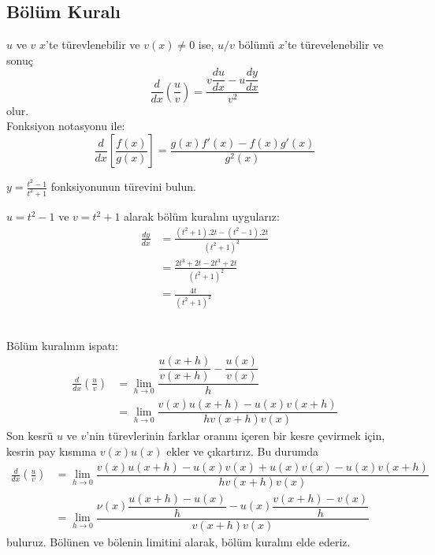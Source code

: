 \subsection{\protect Bölüm Kuralı}
$u$ ve $v$ $x$'te türevlenebilir ve $v(x)\ne 0$ ise, $u/v$ bölümü $x$'te türevelenebilir ve sonuç
	\begin{equation*}
	\dfrac{d}{dx}\left( \dfrac{u}{v}\right) =\dfrac{v\dfrac{du}{dx}-u\dfrac{dy}{dx}}{v^{2}}
	\end{equation*}
olur.\\
Fonksiyon notasyonu ile:
	\begin{equation*}
		\dfrac{d}{dx}\left[ \dfrac{f\left( x\right) }{g\left( x\right) }\right] =\dfrac{g\left( x\right) f'\left( x\right) -f\left( x\right) g'\left( x\right) }{g^{2}\left( x\right) }
	\end{equation*}
\begin{ornek} $\displaystyle y=  \frac{t^2-1}{t^2+1}$ fonksiyonunun türevini bulun.
\end{ornek}
\begin{cozum}
	$u=t^2-1$ ve $v=t^2+1$ alarak bölüm kuralını uygularız:
	\begin{equation*}
	\begin{split}
	\frac{dy}{dx}&=\frac{(t^2+1).2t-(t^2-1).2t}{(t^2+1)^2}\\
		&=\frac{2t^3+2t-2t^3+2t}{(t^2+1)^2}\\
		&=\frac{4t}{(t^2+1)^2}
	\end{split}
	\end{equation*}
\end{cozum}\\


Bölüm kuralının ispatı:
	\begin{equation*}
	\begin{split}
	\frac{d}{dx}\left(\frac{u}{v}\right) &=\lim _{h\rightarrow 0}\dfrac{\dfrac{u\left( x+h\right) }{v\left( x+h\right) }-\dfrac{u\left( x\right) }{v\left( x\right) }}{h}\\
	&=\lim _{h\rightarrow 0}\dfrac{v\left( x\right) u\left( x+h\right) -u\left( x\right) v\left( x+h\right) }{hv\left( x+h\right) v\left( x\right) }
	\end{split}
	\end{equation*}
Son kesrü $u$ ve $v$'nin türevlerinin farklar oranını içeren bir kesre çevirmek için, kesrin pay kısmına $v(x)u(x)$ ekler ve çıkartırız. Bu durumda
	\begin{equation*}
	\begin{split}
	\frac{d}{dx}\left(\frac{u}{v}\right) &=\lim _{h\rightarrow 0}\dfrac{v\left( x\right) u\left( x+h\right) -u\left( x\right) v\left( x\right) +u\left( x\right) v\left( x\right) -u\left( x\right) v\left( x+h\right) }{hv\left( x+h\right) v\left( x\right) }\\
	&=\lim _{h\rightarrow 0}\dfrac{\nu \left( x\right) \dfrac{u\left( x+h\right) -u\left( x\right) }{h}-u\left( x\right) \dfrac{v\left( x+h\right) -v\left( x\right) }{h}}{v\left( x+h\right) v\left( x\right) }
	\end{split}
	\end{equation*}
buluruz. Bölünen ve bölenin limitini alarak, bölüm kuralını elde ederiz.


